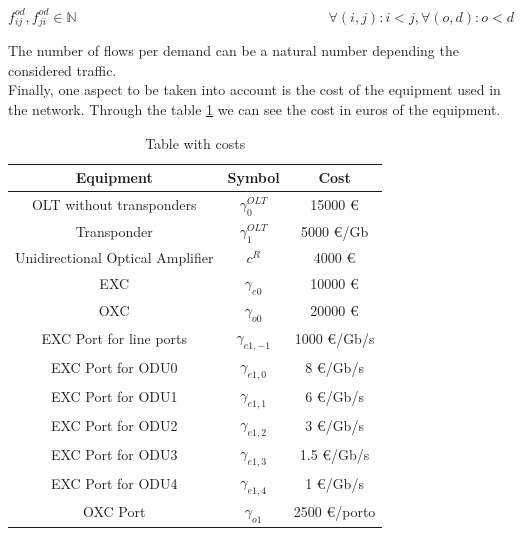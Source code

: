 \begin{equation}
f_{ij}^{od} , f_{ji}^{od} \in \mathbb{N}   \qquad \qquad \qquad \qquad \qquad \qquad \qquad \qquad \qquad
\forall(i,j) : i < j, \forall(o,d) : o < d
\label{ILPOpaque6_CAPEX}
\end{equation}

The number of flows per demand can be a natural number depending the considered traffic.\\

Finally, one aspect to be taken into account is the cost of the equipment used in the network. Through the table \ref{table_cost_ilp} we can see the cost in euros of the equipment.\\

\begin{table}[h!]
\centering
\begin{tabular}{|| c | c | c||}
 \hline
 Equipment & Symbol & Cost \\
 \hline\hline
 OLT without transponders & $\gamma_0^{OLT}$ & 15000 \euro \\
 Transponder & $\gamma_1^{OLT}$ & 5000 \euro/Gb \\
 Unidirectional Optical Amplifier & $c^R$ & 4000 \euro \\
 EXC & $\gamma_{e0}$ & 10000 \euro \\
 OXC & $\gamma_{o0}$ & 20000 \euro \\
 EXC Port for line ports & $\gamma_{e1,-1}$ & 1000 \euro /Gb/s\\
 EXC Port for ODU0 & $\gamma_{e1,0}$ & 8 \euro /Gb/s\\
 EXC Port for ODU1 & $\gamma_{e1,1}$ & 6 \euro /Gb/s\\
 EXC Port for ODU2 & $\gamma_{e1,2}$ & 3 \euro /Gb/s\\
 EXC Port for ODU3 & $\gamma_{e1,3}$ & 1.5 \euro /Gb/s\\
 EXC Port for ODU4 & $\gamma_{e1,4}$ & 1 \euro /Gb/s\\
 OXC Port & $\gamma_{o1}$ & 2500 \euro /porto \\
 \hline
\end{tabular}
\caption{Table with costs}
\label{table_cost_ilp}
\end{table}



